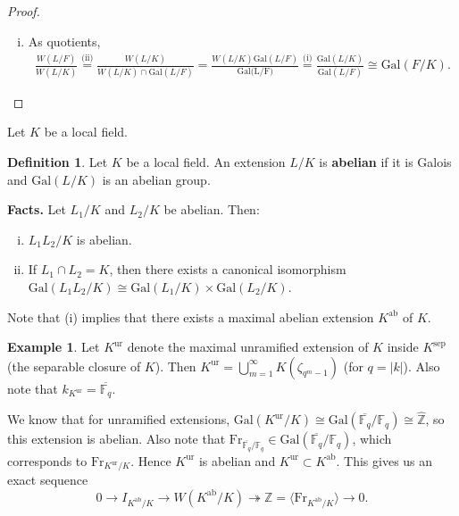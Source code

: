 \documentclass{article}
\theoremstyle{definition}
\newtheorem{example}{Example}[section]
\newtheorem{defn}{Definition}[section]
\begin{document}
\begin{proof}
\begin{enumerate}[(i)]
        \item As quotients, \begin{align*}
            \frac{W(L/F)}{W(L/K)} \stackrel{\text{(ii)}}{=} \frac{W(L/K)}{W(L/K) \cap \text{Gal}(L/F)} = \frac{W(L/K)\text{Gal}(L/F)}{\text{Gal(L/F)}} \stackrel{\text{(i)}}{=} \frac{\text{Gal}(L/K)}{\text{Gal}(L/F)} \cong \text{Gal}(F/K).
        \end{align*}
    \end{enumerate}
\end{proof}
Let $K$ be a local field.
\begin{defn}
    Let $K$ be a local field. An extension $L/K$ is \textbf{abelian} if it is Galois and $\text{Gal}(L/K)$ is an abelian group.
\end{defn}
\textbf{Facts.} Let $L_1/K$ and $L_2/K$ be abelian. Then:
\begin{enumerate}[(i)]
    \item $L_1L_2/K$ is abelian.
    \item If $L_1 \cap L_2 = K$, then there exists a canonical isomorphism $\text{Gal}(L_1L_2/K) \cong \text{Gal}(L_1/K)\times \text{Gal}(L_2/K)$.
\end{enumerate} 
Note that (i) implies that there exists a maximal abelian extension $K^{\text{ab}}$ of $K$.
\begin{example}
    Let $K^{\text{ur}}$ denote the maximal unramified extension of $K$ inside $K^{\text{sep}}$ (the separable closure of $K$). Then $K^{\text{ur}} = \bigcup_{m=1}^{\infty} K(\zeta_{q^m-1})$ (for $q = |k|$). Also note that $k_{K^{\text{ur}}} = \overline{\mathbb{F}_q}$.
    \vspace{1mm}
     
    We know that for unramified extensions, $\text{Gal}(K^{\text{ur}}/K) \cong \text{Gal}(\overline{\mathbb{F}_q}/\mathbb{F}_q) \cong \hat{\mathbb{Z}}$, so this extension is abelian. Also note that $\text{Fr}_{\overline{\mathbb{F}_q}/\mathbb{F}_q} \in \text{Gal}(\overline{\mathbb{F}_q}/\mathbb{F}_q)$, which corresponds to $\text{Fr}_{K^{\text{ur}}/K}$. Hence $K^{\text{ur}}$ is abelian and $K^{\text{ur}} \subset K^{\text{ab}}$. This gives us an exact sequence
    \[
    0 \to I_{K^{\text{ab}}/K} \to W(K^{\text{ab}}/K) \twoheadrightarrow \mathbb{Z} = \langle \text{Fr}_{K^{\text{ab}}/K} \rangle \to 0.
    \]
\end{example}
\end{document}
